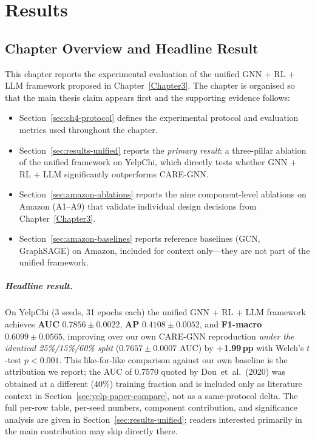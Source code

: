 \chapter{Results}

\section{Chapter Overview and Headline Result}
\label{sec:ch4-overview}

This chapter reports the experimental evaluation of the unified GNN + RL + LLM framework proposed in Chapter~\ref{Chapter3}. The chapter is organised so that the main thesis claim appears first and the supporting evidence follows:

\begin{itemize}
    \item Section~\ref{sec:ch4-protocol} defines the experimental protocol and evaluation metrics used throughout the chapter.
    \item Section~\ref{sec:results-unified} reports the \emph{primary result}: a three-pillar ablation of the unified framework on YelpChi, which directly tests whether GNN + RL + LLM significantly outperforms CARE-GNN.
    \item Section~\ref{sec:amazon-ablations} reports the nine component-level ablations on Amazon (A1--A9) that validate individual design decisions from Chapter~\ref{Chapter3}.
    \item Section~\ref{sec:amazon-baselines} reports reference baselines (GCN, GraphSAGE) on Amazon, included for context only---they are not part of the unified framework.
\end{itemize}

\paragraph{Headline result.} On YelpChi (3 seeds, 31 epochs each) the unified GNN + RL + LLM framework achieves \textbf{AUC} $\mathbf{0.7856 \pm 0.0022}$, \textbf{AP} $\mathbf{0.4108 \pm 0.0052}$, and \textbf{F1-macro} $\mathbf{0.6099 \pm 0.0565}$, improving over our own CARE-GNN reproduction \emph{under the identical 25\%/15\%/60\% split} ($0.7657 \pm 0.0007$ AUC) by \textbf{+1.99\,pp} with Welch's $t$-test $p < 0.001$. This like-for-like comparison against our own baseline is the attribution we report; the AUC of 0.7570 quoted by Dou~et~al.~(2020) was obtained at a different (40\%) training fraction and is included only as literature context in Section~\ref{sec:yelp-paper-compare}, not as a same-protocol delta. The full per-row table, per-seed numbers, component contribution, and significance analysis are given in Section~\ref{sec:results-unified}; readers interested primarily in the main contribution may skip directly there.


